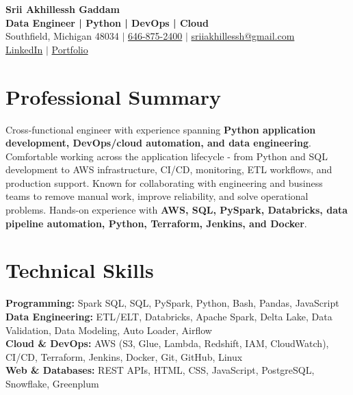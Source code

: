 \documentclass[letterpaper,10pt]{article}
\begin{document}
\fontsize{9.35pt}{10.45pt}\selectfont

\begin{center}
    {\LARGE \textbf{Srii Akhillessh Gaddam}} \\[-1pt]
    \textbf{Data Engineer | Python | DevOps | Cloud} \\[2pt]
    Southfield, Michigan 48034 $|$
    \href{tel:6468752400}{646-875-2400} $|$
    \href{mailto:sriiakhillessh@gmail.com}{sriiakhillessh@gmail.com} \\[1pt]
    \href{https://www.linkedin.com/in/srii-akhiilessh-gaddam-b48668191/}{LinkedIn} $|$
    \href{https://sriiakhillesshg.github.io/portfolio/}{Portfolio}
\end{center}
\vspace{-8pt}

\section{Professional Summary}
\small{Cross-functional engineer with experience spanning \textbf{Python application development, DevOps/cloud automation, and data engineering}. Comfortable working across the application lifecycle - from Python and SQL development to AWS infrastructure, CI/CD, monitoring, ETL workflows, and production support. Known for collaborating with engineering and business teams to remove manual work, improve reliability, and solve operational problems. Hands-on experience with \textbf{AWS, SQL, PySpark, Databricks, data pipeline automation, Python, Terraform, Jenkins, and Docker}.}

\section{Technical Skills}
\small{
\textbf{Programming:} Spark SQL, SQL, PySpark, Python, Bash, Pandas, JavaScript \\
\textbf{Data Engineering:} ETL/ELT, Databricks, Apache Spark, Delta Lake, Data Validation, Data Modeling, Auto Loader, Airflow \\
\textbf{Cloud \& DevOps:} AWS (S3, Glue, Lambda, Redshift, IAM, CloudWatch), CI/CD, Terraform, Jenkins, Docker, Git, GitHub, Linux \\
\textbf{Web \& Databases:} REST APIs, HTML, CSS, JavaScript, PostgreSQL, Snowflake, Greenplum
}

\end{document}
